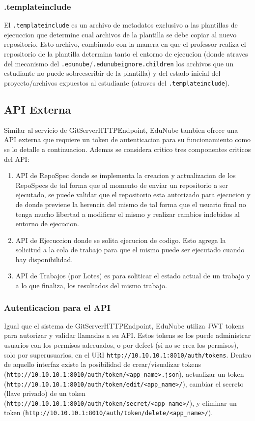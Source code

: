 \subsubsection{.templateinclude}
El \texttt{.templateinclude} es un archivo de metadatos exclusivo a las plantillas de ejecuccion que determine cual archivos de la plantilla se debe copiar al nuevo repositorio. Esto archivo, combinado con la manera en que el professor realiza el repositorio de la plantilla determina tanto el entorno de ejecucion (donde atraves del mecanismo del \texttt{.edunube}/\texttt{.edunubeignore.children} los archivos que un estudiante no puede sobreescribir de la plantilla) y del estado inicial del proyecto/archivos expuestos al estudiante (atraves del \texttt{.templateinclude}).

\subsection{API Externa}
Similar al servicio de GitServerHTTPEndpoint, EduNube tambien ofrece una API externa que requiere un token de autenticacion para su funcionamiento como se lo detalle a continuacion. Ademas se considera critico tres componentes criticos del API:
\begin{enumerate}
  \item API de RepoSpec donde se implementa la creacion y actualizacion de los RepoSpecs de tal forma que al momento de enviar un repositorio a ser ejecutado, se puede validar que el repositorio esta autorizado para ejecucion y de donde previene la herencia del mismo de tal forma que el usuario final no tenga mucho libertad a modificar el mismo y realizar cambios indebidos al entorno de ejecucion.
  \item API de Ejecuccion donde se solita ejecucion de codigo. Esto agrega la solicitud a la cola de trabajo para que el mismo puede ser ejecutado cuando hay disponibilidad.
  \item API de Trabajos (por Lotes) es para soliticar el estado actual de un trabajo y a lo que finaliza, los resultados del mismo trabajo.
\end{enumerate}
\subsubsection{Autenticacion para el API}
Igual que el sistema de GitServerHTTPEndpoint, EduNube utiliza JWT tokens para autorizar y validar llamadas a su API. Estos tokens se los puede administrar usuarios con los permisos adecuados, o por defect (si no se crea los permisos), solo por superusuarios, en el URI \texttt{http://10.10.10.1:8010/auth/tokens}. Dentro de aquello interfaz existe la posibilidad de crear/visualizar tokens \\
(\texttt{http://10.10.10.1:8010/auth/token/<app\_name>.json}), actualizar un token (\texttt{http://10.10.10.1:8010/auth/token/edit/<app\_name>/}), cambiar el secreto (llave privado) de un token\\
(\texttt{http://10.10.10.1:8010/auth/token/secret/<app\_name>/}), y eliminar un token (\texttt{http://10.10.10.1:8010/auth/token/delete/<app\_name>/}).

